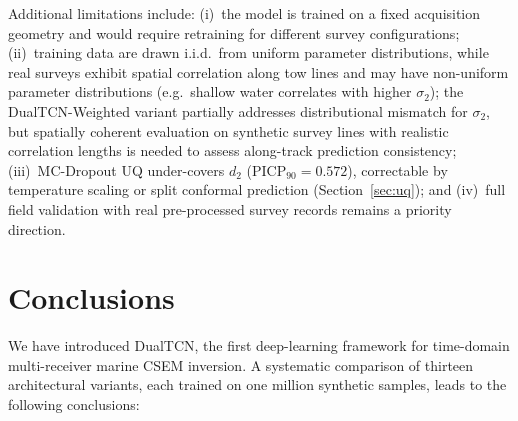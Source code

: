 \documentclass[journal]{IEEEtran}
\begin{document}
Additional limitations include: (i)~the model is trained on a
fixed acquisition geometry and would require retraining for different
survey configurations; (ii)~training data are drawn i.i.d.\ from uniform parameter
distributions, while real surveys exhibit spatial correlation along
tow lines and may have non-uniform parameter distributions (e.g.\
shallow water correlates with higher $\sigma_2$); the
DualTCN-Weighted variant partially addresses distributional mismatch
for $\sigma_2$, but spatially coherent evaluation on synthetic survey
lines with realistic correlation lengths is needed to assess
along-track prediction consistency; (iii)~MC-Dropout UQ under-covers $d_2$
(PICP$_{90} = 0.572$), correctable by temperature scaling or split
conformal prediction (Section~\ref{sec:uq}); and (iv)~full
field validation with real pre-processed survey records remains a
priority direction.

\section{Conclusions}
\label{sec:conclusions}

We have introduced DualTCN, the first deep-learning framework for
time-domain multi-receiver marine CSEM inversion. A systematic
comparison of thirteen architectural variants, each trained on one
million synthetic samples, leads to the following conclusions:
\end{document}
